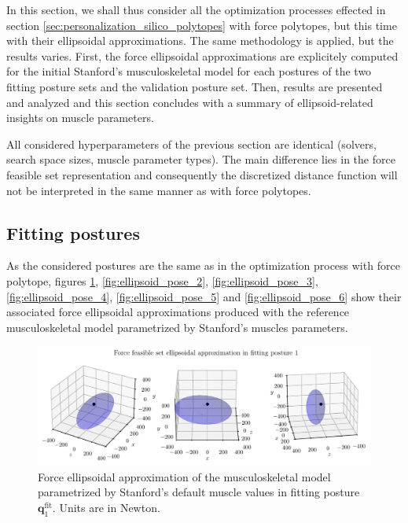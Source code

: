 In this section, we shall thus consider all the optimization processes effected in section \ref{sec:personalization_silico_polytopes} with force polytopes, but this time with their ellipsoidal approximations. 
The same methodology is applied, but the results varies. First, the force ellipsoidal approximations are explicitely computed for the initial Stanford's musculoskeletal model for each postures of the two fitting posture sets and the validation posture set. Then, results are presented and analyzed and this section concludes with a summary of ellipsoid-related insights on muscle parameters. 

All considered hyperparameters of the previous section are identical (solvers, search space sizes, muscle parameter types). The main difference lies in the force feasible set representation and consequently the discretized distance function will not be interpreted in the same manner as with force polytopes.

\subsection{Fitting postures}
As the considered postures are the same as in the optimization process with force polytope, figures \ref{fig:ellipsoid_pose_1}, \ref{fig:ellipsoid_pose_2}, \ref{fig:ellipsoid_pose_3}, \ref{fig:ellipsoid_pose_4}, \ref{fig:ellipsoid_pose_5} and \ref{fig:ellipsoid_pose_6} show their associated force ellipsoidal approximations produced with the reference musculoskeletal model parametrized by Stanford's muscles parameters.

\clearpage
\begin{figure}[!htb]
    \centering
    \captionsetup{justification=centering}
    \begin{minipage}{\linewidth}
        \centering
        \includegraphics[trim={0 0 0 0}, clip, width=1\linewidth]{img/chapter_4/reconstruction_stanford_imgs/STANFORD_ELLIPSOID_POSTURE_FITTING_01.pdf}
    \end{minipage}
    \caption{Force ellipsoidal approximation of the musculoskeletal model parametrized by Stanford's default muscle values in fitting posture $\mathbf{q}_1^{\text{fit}}$. Units are in Newton.}
    \label{fig:ellipsoid_pose_1}
\end{figure}

